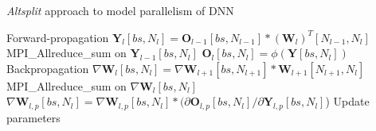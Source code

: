 \begin{algorithm}[H]
\caption{\emph{Altsplit} approach to model parallelism of DNN}
\label{alg:altsplit_altsplit}
{\fontsize{10}{10}\selectfont
\begin{algorithmic}[1]
    \Comment Forward-propagation 
            \State $\pmb{Y}_l[bs, N_l] = \pmb{O}_{l-1}[bs, N_{l-1}] * (\pmb{W}_{l})^T[N_{l-1}, N_l]$
                \State MPI\_Allreduce\_sum on $\pmb{Y}_{l-1}[bs, N_{l}]$ 
            \EndIf
            \State $\pmb{O}_l[bs, N_l] = \phi(\pmb{Y}[bs, N_l])$
        \EndFor
    \EndFor
    \Comment Backpropagation 
            \State $\nabla \pmb{W}_l[bs, N_l]  = \nabla \pmb{W}_{l+1}[bs, 
            N_{l+1}] * \pmb{W}_{l+1}[N_{l+1}, N_l]$
                \State MPI\_Allreduce\_sum on $\nabla \pmb{W}_l[bs, N_l]$
            \EndIf
            \State $\nabla \pmb{W}_{l,p}[bs, N_l] = \nabla \pmb{W}_{l,p}[bs, N_l] * (\partial \pmb{O}_{l,p}[bs, N_l] / \partial \pmb{Y}_{l,p}[bs, N_l]$)
        \EndFor
    \EndFor
        \State Update parameters
    \EndFor
\end{algorithmic}}
\end{algorithm}

